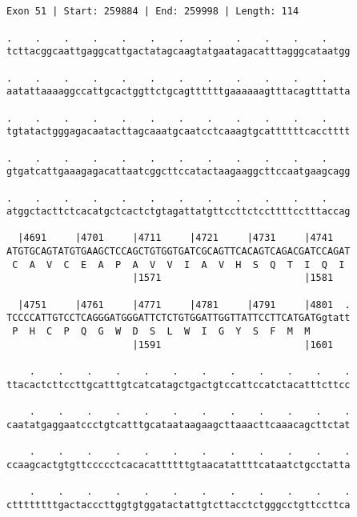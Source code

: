 \documentclass{article}
\begin{document}
\begin{Verbatim}
                                                          
 
Exon 51 | Start: 259884 | End: 259998 | Length: 114
 
.    .    .    .    .    .    .    .    .    .    .    .    
tcttacggcaattgaggcattgactatagcaagtatgaatagacatttagggcataatgg
                                                            
.    .    .    .    .    .    .    .    .    .    .    .    
aatattaaaaggccattgcactggttctgcagttttttgaaaaaagtttacagtttatta
                                                            
.    .    .    .    .    .    .    .    .    .    .    .    
tgtatactgggagacaatacttagcaaatgcaatcctcaaagtgcattttttcacctttt
                                                            
.    .    .    .    .    .    .    .    .    .    .    .    
gtgatcattgaaagagacattaatcggcttccatactaagaaggcttccaatgaagcagg
                                                            
.    .    .    .    .    .    .    .    .    .    .    .    
atggctacttctcacatgctcactctgtagattatgttccttctccttttcctttaccag
                                                            
  |4691     |4701     |4711     |4721     |4731     |4741   
ATGTGCAGTATGTGAAGCTCCAGCTGTGGTGATCGCAGTTCACAGTCAGACGATCCAGAT
 C  A  V  C  E  A  P  A  V  V  I  A  V  H  S  Q  T  I  Q  I 
                      |1571                         |1581   
  
  |4751     |4761     |4771     |4781     |4791     |4801  .
TCCCCATTGTCCTCAGGGATGGGATTCTCTGTGGATTGGTTATTCCTTCATGATGgtatt
 P  H  C  P  Q  G  W  D  S  L  W  I  G  Y  S  F  M  M       
                      |1591                         |1601   
  
    .    .    .    .    .    .    .    .    .    .    .    .
ttacactcttccttgcatttgtcatcatagctgactgtccattccatctacatttcttcc
                                                            
    .    .    .    .    .    .    .    .    .    .    .    .
caatatgaggaatccctgtcatttgcataataagaagcttaaacttcaaacagcttctat
                                                            
    .    .    .    .    .    .    .    .    .    .    .    .
ccaagcactgtgttccccctcacacattttttgtaacatattttcataatctgcctatta
                                                            
    .    .    .    .    .    .    .    .    .    .    .    .
cttttttttgactacccttggtgtggatactattgtcttacctctgggcctgttccttca
                                                            

\end{Verbatim}
\end{document}

